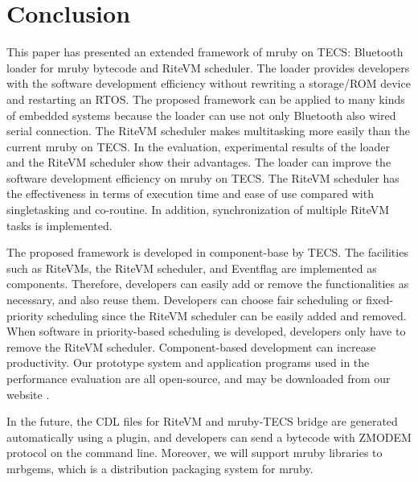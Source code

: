 \documentclass{sig-alternate-05-2015}
\begin{document}
%
%


\section{Conclusion}
\label{sec:Conclusion}
This paper has presented an extended framework of mruby on TECS:
Bluetooth loader for mruby bytecode and RiteVM scheduler.
The loader provides developers with the software development efficiency without rewriting a storage/ROM device and restarting an RTOS.
The proposed framework can be applied to many kinds of embedded systems  because the loader can use not only Bluetooth also wired serial connection.
The RiteVM scheduler makes multitasking more easily than the current mruby on TECS.
In the evaluation, experimental results of the loader and the RiteVM scheduler show their advantages.
The loader can improve the software development efficiency on mruby on TECS.
The RiteVM scheduler has the effectiveness in terms of execution time and ease of use compared with singletasking and co-routine.
In addition, synchronization of multiple RiteVM tasks is implemented.

The proposed framework is developed in component-base by TECS.
The facilities such as RiteVMs, the RiteVM scheduler, and Eventflag are implemented as components.
Therefore, developers can easily add or remove the functionalities as necessary, and also reuse them.
Developers can choose fair scheduling or fixed-priority scheduling since the RiteVM scheduler can be easily added and removed.
When software in priority-based scheduling is developed, developers only have to remove the RiteVM scheduler.
Component-based development can increase productivity.
Our prototype system and application programs used in the performance evaluation are all open-source, and may be downloaded from our website \cite{url:download}.

In the future, the CDL files for RiteVM and mruby-TECS bridge are generated automatically using a plugin, and developers can send a bytecode with ZMODEM protocol on the command line.
Moreover, we will support mruby libraries to mrbgems, which is a distribution packaging system for mruby.
\end{document}
